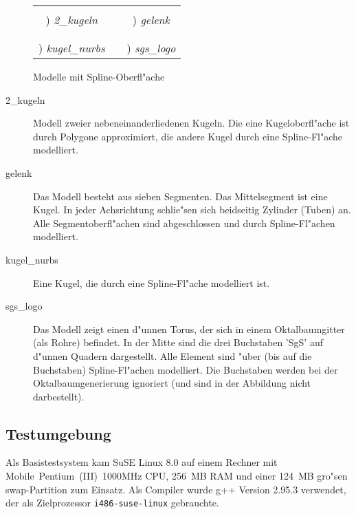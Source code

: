 \begin{figure}[ht]
\begin{center}
\setcounter{piccount}{0}
\newcommand*\picname[1]{\stepcounter{piccount}\alph{piccount}) \emph{#1}}
\newcommand\mypics[4]{\extpic{#1}& &\extpic{#3}\\ 
		      \picname{#2} & & \picname{#4} \\}
\begin{tabular}{cp{0.5cm}c}
    \mypics{2_kugeln}{2\_kugeln}{gelenk}{gelenk} \\ 
    \mypics{kugel_nurbs}{kugel\_nurbs}{sgs_logo}{sgs\_logo}
\end{tabular}
\caption{Modelle mit Spline-Oberfl"ache}
\label{abb_models_spline}
\end{center}
\end{figure}

\begin{description}
\item[2\_kugeln] Modell zweier nebeneinanderliedenen Kugeln. Die eine 
    Kugeloberfl"ache ist durch Polygone approximiert, die andere Kugel 
    durch eine Spline-Fl"ache modelliert. 
\item[gelenk] Das Modell besteht aus sieben Segmenten. Das Mittelsegment 
    ist eine Kugel. In jeder Achsrichtung schlie"sen sich beidseitig 
    Zylinder (Tuben) an. Alle Segment\-oberfl"achen sind abgeschlossen und 
    durch Spline-Fl"achen modelliert. 
\item[kugel\_nurbs] Eine Kugel, die durch eine Spline-Fl"ache modelliert ist. 
\item[sgs\_logo] Das Modell zeigt einen d"unnen Torus, der sich in einem 
    Oktalbaumgitter (als Rohre) befindet. 
    In der Mitte sind die drei Buchstaben 'SgS' auf d"unnen Quadern 
    dargestellt. Alle Element sind "uber (bis auf die Buchstaben) 
    Spline-Fl"achen modelliert. 
    Die Buchstaben werden bei der Oktalbaumgenerierung ignoriert (und sind 
    in der Abbildung nicht darbestellt). 
\end{description}

\subsection{Testumgebung}
\label{testenv}
Als Basistestsystem kam SuSE Linux 8.0 auf einem Rechner mit 
Mobile~Pentium~(III)~1000MHz CPU, 256~MB RAM und einer 124~MB gro"sen 
swap-Partition zum Einsatz. Als Compiler wurde g++ Version 2.95.3 verwendet, 
der als Zielprozessor \texttt{i486-suse-linux} gebrauchte. 

